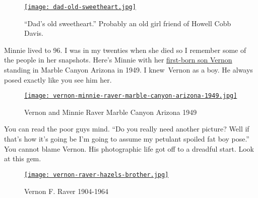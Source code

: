\begin{SCfigure}
\centering
\href{http://conceptcontrol.smugmug.com/People/Minnie-Raver/i-GGmLK2W/A}{\texttt{[image: dad-old-sweetheart.jpg]}}
\caption{``Dad's old sweetheart.'' Probably an old girl friend of Howell Cobb Davis.}
\label{fig:4230X3}
\end{SCfigure}


Minnie lived to 96. I was in my twenties when she died so I remember
some of the people in her snapshots. Here's Minnie with her
\href{http://www.findagrave.com/cgi-bin/fg.cgi?page=gr\&GRid=61581142}{first-born
son Vernon} standing in Marble Canyon Arizona in 1949. I knew~Vernon as
a boy. He always posed exactly like you see him her.



\begin{SCfigure}
\centering
\href{http://conceptcontrol.smugmug.com/People/Minnie-Raver/i-DTmc5Zb/A}{\texttt{[image: vernon-minnie-raver-marble-canyon-arizona-1949.jpg]}}
\caption{Vernon and Minnie Raver Marble Canyon Arizona 1949}
\label{fig:4230X4}
\end{SCfigure}


You can read the poor guys mind. ``Do you really need another picture?
Well if that's how it's going be I'm going to assume my petulant spoiled
fat boy pose.'' You cannot blame Vernon. His photographic life got off
to a dreadful start. Look at this gem.



\begin{SCfigure}
\centering
\href{http://conceptcontrol.smugmug.com/People/Minnie-Raver/i-pms8BTb/A}{\texttt{[image: vernon-raver-hazels-brother.jpg]}}
\caption{Vernon F. Raver 1904-1964}
\label{fig:4230X5}
\end{SCfigure}


